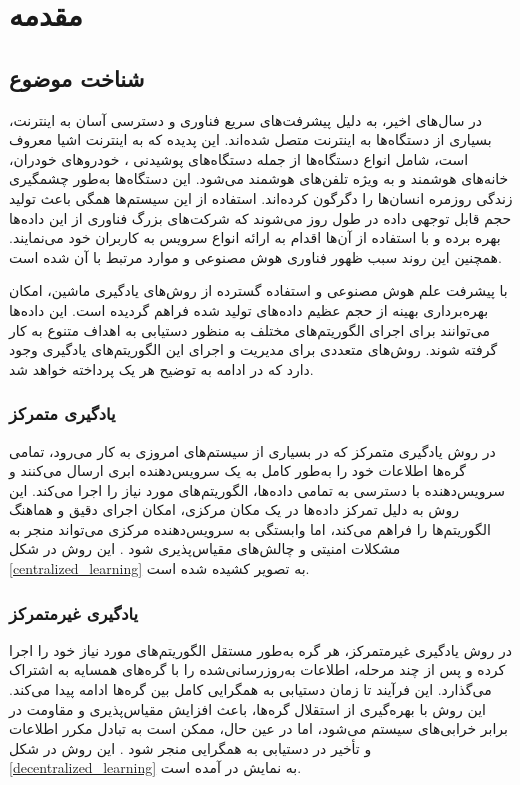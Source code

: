 \chapter{مقدمه}

\section{شناخت موضوع}
در سال‌های اخیر، به دلیل پیشرفت‌های سریع فناوری و دسترسی آسان به اینترنت، بسیاری از دستگاه‌ها به اینترنت متصل شده‌اند. این پدیده که به اینترنت اشیا%
معروف است، شامل انواع دستگاه‌ها از جمله دستگاه‌های پوشیدنی%
%
، خودروهای خودران، خانه‌های هوشمند%
و به ویژه تلفن‌های هوشمند%
می‌شود. این دستگاه‌ها به‌طور چشمگیری زندگی روزمره انسان‌ها را دگرگون کرده‌اند. استفاده از این سیستم‌ها همگی باعث تولید حجم قابل توجهی داده در طول روز می‌شوند که شرکت‌های بزرگ فناوری از این داده‌ها بهره برده و با استفاده از آن‌ها اقدام به ارائه انواع سرویس به کاربران خود می‌نمایند. همچنین این روند سبب ظهور فناوری هوش مصنوعی و موارد مرتبط با آن شده است.

با پیشرفت علم هوش مصنوعی و استفاده گسترده از روش‌های یادگیری ماشین، امکان بهره‌برداری بهینه از حجم عظیم داده‌های تولید شده فراهم گردیده است. این داده‌ها می‌توانند برای اجرای الگوریتم‌های مختلف به منظور دستیابی به اهداف متنوع به کار گرفته شوند. روش‌های متعددی برای مدیریت و اجرای این الگوریتم‌های یادگیری وجود دارد که در ادامه به توضیح هر یک پرداخته خواهد شد.


\subsection{
	یادگیری متمرکز%
}
در روش یادگیری متمرکز که در بسیاری از سیستم‌های امروزی به کار می‌رود، تمامی گره‌ها%
اطلاعات خود را به‌طور کامل به یک سرویس‌دهنده ابری%
ارسال می‌کنند و سرویس‌دهنده با دسترسی به تمامی داده‌ها، الگوریتم‌های مورد نیاز را اجرا می‌کند. این روش به دلیل تمرکز داده‌ها در یک مکان مرکزی، امکان اجرای دقیق و هماهنگ الگوریتم‌ها را فراهم می‌کند، اما وابستگی به سرویس‌دهنده مرکزی می‌تواند منجر به مشکلات امنیتی و چالش‌های مقیاس‌پذیری شود
\cite{elbir2022family}.
این روش در شکل
\ref{centralized_learning}
به تصویر کشیده شده است.


\subsection{
	یادگیری غیرمتمرکز%
}
در روش یادگیری غیرمتمرکز، هر گره به‌طور مستقل الگوریتم‌های مورد نیاز خود را اجرا کرده و پس از چند مرحله، اطلاعات به‌روزرسانی‌شده را با گره‌های همسایه به اشتراک می‌گذارد. این فرآیند تا زمان دستیابی به همگرایی کامل بین گره‌ها ادامه پیدا می‌کند. این روش با بهره‌گیری از استقلال گره‌ها، باعث افزایش مقیاس‌پذیری و مقاومت در برابر خرابی‌های سیستم می‌شود، اما در عین حال، ممکن است به تبادل مکرر اطلاعات و تأخیر در دستیابی به همگرایی منجر شود
\cite{zhou2019edge}.
این روش در شکل
\ref{decentralized_learning}
به نمایش در آمده است.

